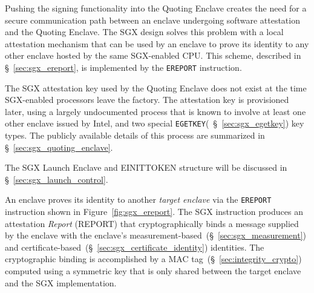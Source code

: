 Pushing the signing functionality into the Quoting Enclave creates the need for
a secure communication path between an enclave undergoing software attestation
and the Quoting Enclave. The SGX design solves this problem with a local
attestation mechanism that can be used by an enclave to prove its identity to
any other enclave hosted by the same SGX-enabled CPU. This scheme, described in
\S~\ref{sec:sgx_ereport}, is implemented by the \texttt{EREPORT} instruction.


The SGX attestation key used by the Quoting Enclave does not exist at the time
SGX-enabled processors leave the factory. The attestation key is provisioned
later, using a largely undocumented process that is known to involve at least
one other enclave issued by Intel, and two special
\texttt{EGETKEY}(~\S~\ref{sec:sgx_egetkey}) key types. The publicly available
details of this process are summarized in \S~\ref{sec:sgx_quoting_enclave}.

The SGX Launch Enclave and EINITTOKEN structure will be discussed in
\S~\ref{sec:sgx_launch_control}.


\label{sec:sgx_ereport}


An enclave proves its identity to another \textit{target enclave} via the
\texttt{EREPORT} instruction shown in Figure~\ref{fig:sgx_ereport}. The SGX
instruction produces an attestation \textit{Report} (REPORT) that
cryptographically binds a message supplied by the enclave with the enclave's
measurement-based~(\S~\ref{sec:sgx_measurement}) and
certificate-based~(\S~\ref{sec:sgx_certificate_identity}) identities. The
cryptographic binding is accomplished by a MAC
tag~(\S~\ref{sec:integrity_crypto}) computed using a symmetric key that is only
shared between the target enclave and the SGX implementation.

